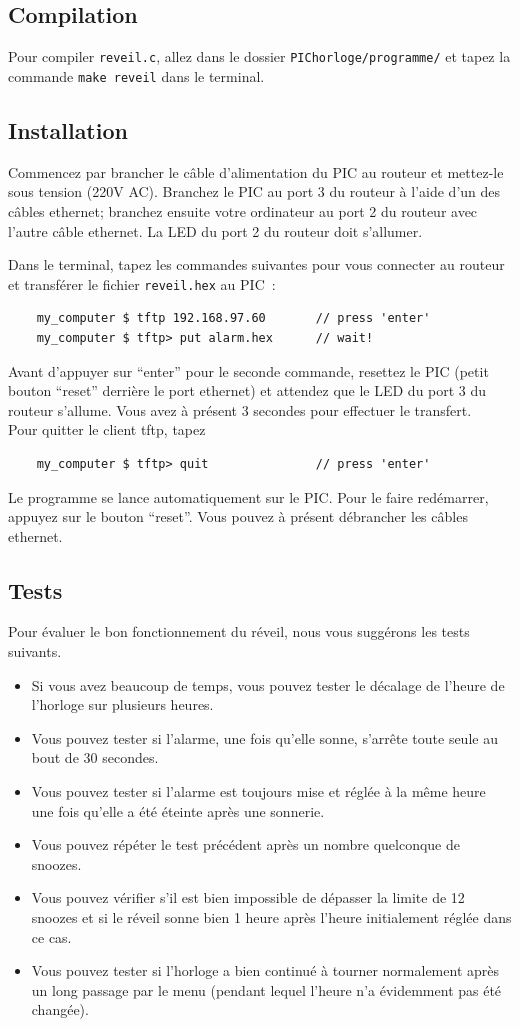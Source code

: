 \documentclass[12pt,a4paper]{article}
\begin{document}
\subsection{Compilation}
Pour compiler \texttt{reveil.c}, allez dans le dossier \texttt{PIChorloge/programme/} et tapez la commande \texttt{make reveil} dans le terminal.

\subsection{Installation}
Commencez par brancher le câble d'alimentation du PIC au routeur et mettez-le sous tension (220V AC). Branchez le PIC au port 3 du routeur à l'aide d'un des câbles ethernet; branchez ensuite votre ordinateur au port 2 du routeur avec l'autre câble ethernet. La LED du port 2 du routeur doit s'allumer.

Dans le terminal, tapez les commandes suivantes pour vous connecter au routeur et transférer le fichier \texttt{reveil.hex} au PIC~:
\begin{verbatim}
    my_computer $ tftp 192.168.97.60       // press 'enter'
    my_computer $ tftp> put alarm.hex      // wait!
\end{verbatim}
Avant d'appuyer sur ``enter'' pour le seconde commande, resettez le PIC (petit bouton ``reset'' derrière le port ethernet) et attendez que le LED du port 3 du routeur s'allume. Vous avez à présent 3 secondes pour effectuer le transfert.\\
Pour quitter le client tftp, tapez
\begin{verbatim}
    my_computer $ tftp> quit               // press 'enter'
\end{verbatim}
Le programme se lance automatiquement sur le PIC. Pour le faire redémarrer, appuyez sur le bouton ``reset''. Vous pouvez à présent débrancher les câbles ethernet.

\subsection{Tests}
Pour évaluer le bon fonctionnement du réveil, nous vous suggérons les tests suivants.
\begin{itemize}
\item Si vous avez beaucoup de temps, vous pouvez tester le décalage de l'heure de l'horloge sur plusieurs heures. 
\item Vous pouvez tester si l'alarme, une fois qu'elle sonne, s'arrête toute seule au bout de 30 secondes.
\item Vous pouvez tester si l'alarme est toujours mise et réglée à la même heure une fois qu'elle a été éteinte après une sonnerie.
\item Vous pouvez répéter le test précédent après un nombre quelconque de snoozes.
\item Vous pouvez vérifier s'il est bien impossible de dépasser la limite de 12 snoozes et si le réveil sonne bien 1 heure après l'heure initialement réglée dans ce cas.
\item Vous pouvez tester si l'horloge a bien continué à tourner normalement après un long passage par le menu (pendant lequel l'heure n'a évidemment pas été changée).
\end{itemize}
\end{document}

